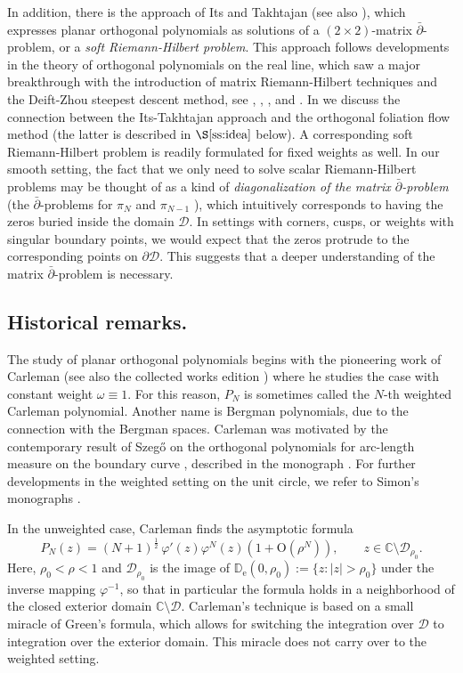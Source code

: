 \documentclass{amsart}
\newcommand{\be}{\begin{equation}}
\newcommand{\ee}{\end{equation}}
\newcommand{\C}{\mathbb{C}}
\newcommand{\D}{\mathbb{D}}
\newcommand{\calD}{\mathcal{D}}
\theoremstyle{definition}
\theoremstyle{remark}
\newcommand{\e}{\mathrm{e}}
\newcommand{\Ordo}{\mathrm{O}}
\numberwithin{equation}{subsection}
\begin{document}
In addition, there is the approach of Its and Takhtajan
\cite{ItsTakhtajan} (see also \cite{KleinMcLaughlin}), 
which expresses planar orthogonal polynomials
as solutions of a $(2\times 2)$-matrix $\bar\partial$-problem, 
or a {\em soft Riemann-Hilbert problem}. 
This approach follows developments in the theory
of orthogonal polynomials on the real line, which
saw a major breakthrough with the introduction of 
matrix Riemann-Hilbert techniques and the Deift-Zhou steepest descent
method, see \cite{Its1}, \cite{Its2}, \cite{DeiftZhou}, and  \cite{Deift-PNAS}.
In \cite[Section~7]{HW-ONP}
we discuss the connection between the Its-Takhtajan approach and the 
orthogonal foliation flow method (the latter is described in 
$\S\ref{ss:idea}$ below). A corresponding soft Riemann-Hilbert problem
is readily formulated for fixed weights as well. In our smooth setting,
the fact that we only need to solve scalar Riemann-Hilbert problems
may be thought of as a kind of {\em diagonalization of the matrix
$\bar\partial$-problem} (the $\bar\partial$-problems for 
$\pi_N$ and $\pi_{N-1}$
),
which intuitively corresponds to
having the zeros buried inside the domain $\calD$.   
In settings with corners, cusps, or weights with singular 
boundary points, we would expect that the 
zeros protrude to the corresponding
points on $\partial\calD$. This suggests that a deeper
understanding of the matrix $\bar\partial$-problem
is necessary.

\subsection{Historical remarks.}
\label{ss:Carleman}
The study of planar orthogonal polynomials
begins with the pioneering work of Carleman \cite{Carleman} 
(see also the collected works edition \cite{Carl2})
where he studies the case with constant weight $\omega\equiv 1$. 
For this reason, $P_N$ is sometimes called the $N$-th 
weighted Carleman polynomial. 
Another name is Bergman polynomials,
due to the connection with the Bergman spaces.
Carleman was motivated by the contemporary result
of Szeg\H{o} on the orthogonal polynomials for
arc-length measure on the boundary curve \cite{szego}, 
described in the monograph \cite{Szeg-book}.
For further developments in the weighted setting
on the unit circle, we refer to Simon's monographs 
\cite{simonbook1, simonbook2}.

In the unweighted case, Carleman 
finds the asymptotic formula 
\be\label{eq:Carleman}
P_N(z)=(N+1)^{\frac12}\,\varphi'(z)
\varphi^N(z)\left(1+\Ordo(\rho^N)\right),
\qquad z\in \C\setminus\calD_{\rho_0}.
\ee
Here, $\rho_0<\rho<1$ and $\calD_{\rho_0}$ is the image of
$\D_\e(0,\rho_0):=\{z:|z|>\rho_0\}$ under the 
inverse mapping $\varphi^{-1}$, so that
in particular the formula holds in a neighborhood of the closed
exterior domain $\C\setminus \calD$. Carleman's 
technique is based on a small miracle
of Green's formula, which allows for switching 
the integration over $\calD$
to integration over the exterior domain. 
This miracle does not
carry over to the weighted setting.
\end{document}
